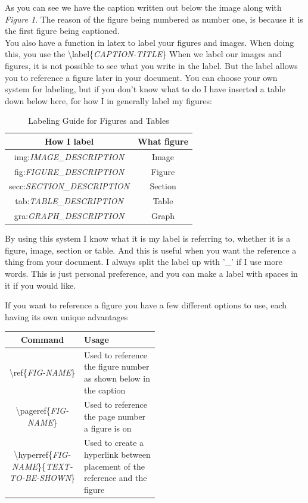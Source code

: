 \documentclass{article}
\newcommand{\bs}[1]{\textbackslash{}#1} %
\begin{document}
As you can see we have the caption written out below the image along with \textit{Figure 1}.
The reason of the figure being numbered as number one, is because it is the first figure being captioned. \\

You also have a function in latex to label your figures and images. When doing this, you use the \bs{label\{\textit{CAPTION-TITLE}\}}
When we label our images and figures, it is not possible to see what you write in the label.
But the label allows you to reference a figure later in your document. You can choose your own system for labeling, but if you don't know what to do I have inserted
a table down below here, for how I in generally label my figures: \\

\begin{table}[h]
    \centering
    \begin{tabular}{|c|c|}
        \hline
        \rowcolor{gray!30}
        How I label & What figure \\ 
        \hline
        img:\textit{IMAGE\_DESCRIPTION} & Image \\ 
        \hline
        fig:\textit{FIGURE\_DESCRIPTION} & Figure \\ 
        \hline
        secc:\textit{SECTION\_DESCRIPTION} & Section \\ 
        \hline
        tab:\textit{TABLE\_DESCRIPTION} & Table \\ 
        \hline
        gra:\textit{GRAPH\_DESCRIPTION} & Graph \\ 
        \hline
    \end{tabular}
    \caption{Labeling Guide for Figures and Tables}
    \label{tab:caption_labels}
\end{table}


By using this system I know what it is my label is referring to, whether it is a figure, image, section or table. And this is useful 
when you want the reference a thing from your document. I always split the label up with '\_' if I use more words. This is just personal preference, and you can make a
label with spaces in it if you would like.

If you want to reference a figure you have a few different options to use, each having its own unique advantages

\begin{table}[h]
    \centering
    \begin{tabular}{|c|p{0.50\linewidth}|}
        \hline
        \rowcolor{gray!30}
        Command & Usage \\
        \hline
        \bs{ref\{\textit{FIG-NAME}\}} & Used to reference the figure number as shown below in the caption \\
        \hline
        \bs{pageref\{\textit{FIG-NAME}\}} & Used to reference the page number a figure is on \\
        \hline
        \bs{hyperref\{\textit{FIG-NAME}\}\{\textit{TEXT-TO-BE-SHOWN}\}} & Used to create a hyperlink between placement of the reference
         and the figure \\
        \hline
    \end{tabular}
\end{table}
\end{document}
